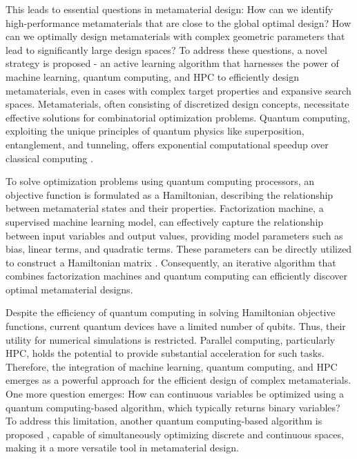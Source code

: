 This leads to essential questions in metamaterial design:
How can we identify high-performance metamaterials that are close to the global optimal design?
How can we optimally design metamaterials with complex geometric parameters that lead to significantly large design spaces?
To address these questions, a novel strategy is proposed - an active learning algorithm that harnesses the power of machine learning, quantum computing, and HPC to efficiently design metamaterials, even in cases with complex target properties and expansive search spaces. Metamaterials, often consisting of discretized design concepts, necessitate effective solutions for combinatorial optimization problems. Quantum computing, exploiting the unique principles of quantum physics like superposition, entanglement, and tunneling, offers exponential computational speedup over classical computing \cite{10.1038/nphys2900}.

To solve optimization problems using quantum computing processors, an objective function is formulated as a Hamiltonian, describing the relationship between metamaterial states and their properties. Factorization machine, a supervised machine learning model, can effectively capture the relationship between input variables and output values, providing model parameters such as bias, linear terms, and quadratic terms. These parameters can be directly utilized to construct a Hamiltonian matrix \cite{5694074}. Consequently, an iterative algorithm that combines factorization machines \cite{PhysRevResearch.2.013319} and quantum computing can efficiently discover optimal metamaterial designs.

Despite the efficiency of quantum computing in solving Hamiltonian objective functions, current quantum devices have a limited number of qubits. Thus, their utility for numerical simulations is restricted. Parallel computing, particularly HPC, holds the potential to provide substantial acceleration for such tasks. Therefore, the integration of machine learning, quantum computing, and HPC emerges as a powerful approach for the efficient design of complex metamaterials.
One more question emerges: How can continuous variables be optimized using a quantum computing-based algorithm, which typically returns binary variables? To address this limitation, another quantum computing-based algorithm is proposed \cite{PhysRevResearch.4.023062}, capable of simultaneously optimizing discrete and continuous spaces, making it a more versatile tool in metamaterial design.
